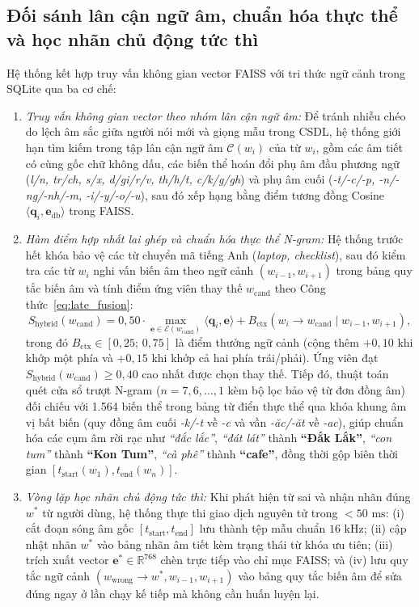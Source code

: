 \documentclass[12pt,a4paper]{article}
\begin{document}
\subsection{Đối sánh lân cận ngữ âm, chuẩn hóa thực thể và học nhãn chủ động tức thì}
Hệ thống kết hợp truy vấn không gian vector FAISS với tri thức ngữ cảnh trong SQLite qua ba cơ chế:
\begin{enumerate}
  \item \textit{Truy vấn không gian vector theo nhóm lân cận ngữ âm:} Để tránh nhiễu chéo do lệch âm sắc giữa người nói mới và giọng mẫu trong CSDL, hệ thống giới hạn tìm kiếm trong tập lân cận ngữ âm $\mathcal{C}(w_i)$ của từ $w_i$, gồm các âm tiết có cùng gốc chữ không dấu, các biến thể hoán đổi phụ âm đầu phương ngữ (\textit{l/n, tr/ch, s/x, d/gi/r/v, th/h/t, c/k/g/gh}) và phụ âm cuối (\textit{-t/-c/-p, -n/-ng/-nh/-m, -i/-y/-o/-u}), sau đó xếp hạng bằng điểm tương đồng Cosine $\langle \mathbf{q}_i, \mathbf{e}_{\mathrm{db}} \rangle$ trong FAISS.
  \item \textit{Hàm điểm hợp nhất lai ghép và chuẩn hóa thực thể N-gram:} Hệ thống trước hết khóa bảo vệ các từ chuyển mã tiếng Anh (\textit{laptop, checklist}), sau đó kiểm tra các từ $w_i$ nghi vấn biến âm theo ngữ cảnh $(w_{i-1}, w_{i+1})$ trong bảng quy tắc biến âm và tính điểm ứng viên thay thế $w_{\mathrm{cand}}$ theo Công thức~\eqref{eq:late_fusion}:
  \begin{equation}
  S_{\mathrm{hybrid}}(w_{\mathrm{cand}}) = 0{,}50 \cdot \max_{\mathbf{e} \in \mathcal{E}(w_{\mathrm{cand}})} \langle \mathbf{q}_i, \mathbf{e} \rangle + B_{\mathrm{ctx}}(w_i \to w_{\mathrm{cand}} \mid w_{i-1}, w_{i+1}),
  \label{eq:late_fusion}
  \end{equation}
  trong đó $B_{\mathrm{ctx}} \in [0{,}25;\, 0{,}75]$ là điểm thưởng ngữ cảnh (cộng thêm $+0{,}10$ khi khớp một phía và $+0{,}15$ khi khớp cả hai phía trái/phải). Ứng viên đạt $S_{\mathrm{hybrid}}(w_{\mathrm{cand}}) \ge 0{,}40$ cao nhất được chọn thay thế. Tiếp đó, thuật toán quét cửa sổ trượt N-gram ($n = 7, 6, \dots, 1$ kèm bộ lọc bảo vệ từ đơn đồng âm) đối chiếu với 1.564 biến thể trong bảng từ điển thực thể qua khóa khung âm vị bất biến (quy đồng âm cuối \textit{-k/-t} về \textit{-c} và vần \textit{-ăc/-ăt} về \textit{-ac}), giúp chuẩn hóa các cụm âm rời rạc như \textit{``đắc lắc''}, \textit{``đát lát''} thành \textbf{``Đắk Lắk''}, \textit{``con tum''} thành \textbf{``Kon Tum''}, \textit{``cà phê''} thành \textbf{``cafe''}, đồng thời gộp biên thời gian $[t_{\mathrm{start}}(w_1), t_{\mathrm{end}}(w_n)]$.
  \item \textit{Vòng lặp học nhãn chủ động tức thì:} Khi phát hiện từ sai và nhận nhãn đúng $w^*$ từ người dùng, hệ thống thực thi giao dịch nguyên tử trong $< 50\text{ ms}$: (i) cắt đoạn sóng âm gốc $[t_{\mathrm{start}}, t_{\mathrm{end}}]$ lưu thành tệp mẫu chuẩn $16\text{ kHz}$; (ii) cập nhật nhãn $w^*$ vào bảng nhãn âm tiết kèm trạng thái từ khóa ưu tiên; (iii) trích xuất vector $\mathbf{e}^* \in \mathbb{R}^{768}$ chèn trực tiếp vào chỉ mục FAISS; và (iv) lưu quy tắc ngữ cảnh $(w_{\mathrm{wrong}} \to w^*, w_{i-1}, w_{i+1})$ vào bảng quy tắc biến âm để sửa đúng ngay ở lần chạy kế tiếp mà không cần huấn luyện lại.
\end{enumerate}
\end{document}
